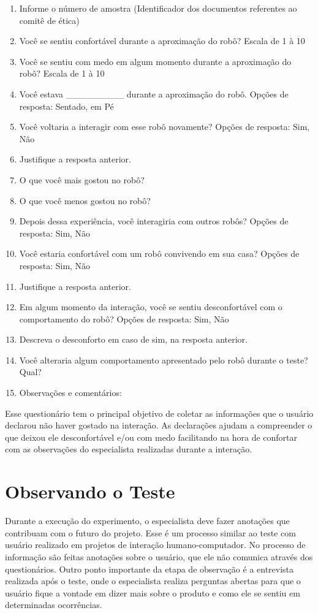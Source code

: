 \begin{enumerate}
	\item Informe o número de amostra (Identificador dos documentos referentes ao comitê de ética)
	\item Você se sentiu confortável durante a aproximação do robô? Escala de 1 à 10
	\item Você se sentiu com medo em algum momento durante a aproximação do robô? Escala de 1 à 10
	\item Você estava \_\_\_\_\_\_\_\_\_ durante a aproximação do robô. Opções de resposta: Sentado, em Pé
	\item Você voltaria a interagir com esse robô novamente? Opções de resposta: Sim, Não
	\item Justifique a resposta anterior.
	\item O que você mais gostou no robô?
	\item O que você menos gostou no robô?
	\item Depois dessa experiência, você interagiria com outros robôs? Opções de resposta: Sim, Não
	\item Você estaria confortável com um robô convivendo em sua casa? Opções de resposta: Sim, Não
	\item Justifique a resposta anterior.
	\item Em algum momento da interação, você se sentiu desconfortável com o comportamento do robô? Opções de resposta: Sim, Não
	\item Descreva o desconforto em caso de sim, na resposta anterior.
	\item Você alteraria algum comportamento apresentado pelo robô durante o teste? Qual?
	\item Observações e comentários:
\end{enumerate}

Esse questionário tem o principal objetivo de coletar as informações que o usuário declarou não haver gostado na interação. As declarações ajudam a compreender o que deixou ele desconfortável e/ou com medo facilitando na hora de confortar com as observações do especialista realizadas durante a interação.

\section{Observando o Teste}
\label{sec:observacoesteste}
Durante a execução do experimento, o especialista deve fazer anotações que contribuam com o futuro do projeto. Esse é um processo similar ao teste com usuário realizado em projetos de interação humano-computador. No processo de informação são feitas anotações sobre o usuário, que ele não comunica através dos questionários. Outro ponto importante da etapa de observação é a entrevista realizada após o teste, onde o especialista realiza perguntas abertas para que o usuário fique a vontade em dizer mais sobre o produto e como ele se sentiu em determinadas ocorrências.

